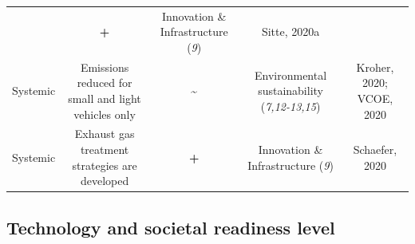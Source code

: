 \documentclass[
]{book}
\begin{document}
\begin{longtable}[]{@{}ccccc@{}}
\begin{minipage}[t]{0.16\columnwidth}
\end{minipage} & \begin{minipage}[t]{0.17\columnwidth}\centering
\textbf{+}\strut
\end{minipage} & \begin{minipage}[t]{0.17\columnwidth}\centering
Innovation \& Infrastructure (\emph{9})\strut
\end{minipage} & \begin{minipage}[t]{0.17\columnwidth}\centering
Sitte, 2020a\strut
\end{minipage}\tabularnewline
\begin{minipage}[t]{0.17\columnwidth}\centering
Systemic\strut
\end{minipage} & \begin{minipage}[t]{0.16\columnwidth}\centering
Emissions reduced for small and light vehicles only\strut
\end{minipage} & \begin{minipage}[t]{0.17\columnwidth}\centering
\textbf{\textasciitilde{}}\strut
\end{minipage} & \begin{minipage}[t]{0.17\columnwidth}\centering
Environmental sustainability (\emph{7,12-13,15})\strut
\end{minipage} & \begin{minipage}[t]{0.17\columnwidth}\centering
Kroher, 2020; VCOE, 2020\strut
\end{minipage}\tabularnewline
\begin{minipage}[t]{0.17\columnwidth}\centering
Systemic\strut
\end{minipage} & \begin{minipage}[t]{0.16\columnwidth}\centering
Exhaust gas treatment strategies are developed\strut
\end{minipage} & \begin{minipage}[t]{0.17\columnwidth}\centering
\textbf{+}\strut
\end{minipage} & \begin{minipage}[t]{0.17\columnwidth}\centering
Innovation \& Infrastructure (\emph{9})\strut
\end{minipage} & \begin{minipage}[t]{0.17\columnwidth}\centering
Schaefer, 2020\strut
\end{minipage}\tabularnewline
\bottomrule
\end{longtable}

\hypertarget{technology-and-societal-readiness-level-10}{%
\subsection*{Technology and societal readiness level}\label{technology-and-societal-readiness-level-10}}
\end{document}
